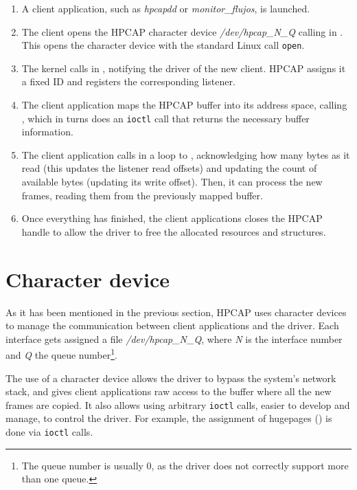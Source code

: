 \documentclass[oneside]{hpman}
\begin{document}
\begin{enumerate}
\item A client application, such as \textit{hpcapdd} or \textit{monitor\_flujos}, is launched.
\item The client opens the HPCAP character device \textit{/dev/hpcap\_N\_Q} calling  in . This opens the character device with the standard Linux call \texttt{open}.
\item The kernel calls  in , notifying the driver of the new client. HPCAP assigns it a fixed ID and registers the corresponding listener.
\item The client application maps the HPCAP buffer into its address space, calling , which in turns does an \texttt{ioctl} call that returns the necessary buffer information.
\item The client application calls in a loop to , acknowledging how many bytes as it read (this updates the listener read offsets) and updating the count of available bytes (updating its write offset). Then, it can process the new frames, reading them from the previously mapped buffer.
\item Once everything has finished, the client applications closes the HPCAP handle to allow the driver to free the allocated resources and structures.
\end{enumerate}

\section{Character device}
\label{sec:Chardev}

As it has been mentioned in the previous section, HPCAP uses character devices to manage the communication between client applications and the driver. Each interface gets assigned a file \textit{/dev/hpcap\_N\_Q}, where \textit{N} is the interface number and \textit{Q} the queue number\footnote{The queue number is usually 0, as the driver does not correctly support more than one queue.}.

The use of a character device allows the driver to bypass the system's network stack, and gives client applications raw access to the buffer where all the new frames are copied. It also allows using arbitrary \texttt{ioctl} calls, easier to develop and manage, to control the driver. For example, the assignment of hugepages () is done via \texttt{ioctl} calls.
\end{document}
